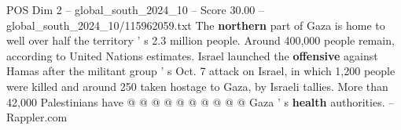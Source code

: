 \begin{textsample}{POS Dim 2 – global\_south\_2024\_10 – Score 30.00 – global\_south\_2024\_10/115962059.txt}
The \textbf{northern} part of Gaza is home to well over half the territory ' s 2.3 million people.
Around 400,000 people remain, according to United Nations estimates.
Israel launched the \textbf{offensive} against Hamas after the militant group ' s Oct. 7 attack on Israel, in which 1,200 people were killed and around 250 taken hostage to Gaza, by Israeli tallies.
More than 42,000 Palestinians have @ @ @ @ @ @ @ @ @ @ Gaza ' s \textbf{health} authorities. -- Rappler.com

\end{textsample}

